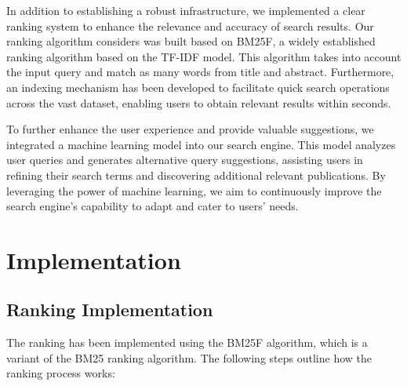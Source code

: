 \documentclass{article}
\begin{document}
In addition to establishing a robust infrastructure, we implemented a clear ranking 
system to enhance the relevance and accuracy of search results.
Our ranking algorithm considers was built based on BM25F, %
a widely established ranking algorithm based on the TF-IDF model. This algorithm takes into
account the input query and match as many words from title and abstract. 
Furthermore, an indexing mechanism has been developed
to facilitate quick search operations across the vast dataset, enabling users to obtain relevant 
results within seconds.

To further enhance the user experience and provide valuable suggestions, we integrated a machine 
learning model into our search engine. This model analyzes user queries and generates 
alternative query suggestions, assisting users in refining their search terms and discovering 
additional relevant publications. By leveraging the power of machine learning, we aim to 
continuously improve the search engine's capability to adapt and cater to users' needs.

\section{Implementation}
\subsection{Ranking Implementation}

The ranking has been implemented using the BM25F algorithm, which is a variant of the BM25 ranking algorithm. The following steps outline how the ranking process works:
\end{document}
